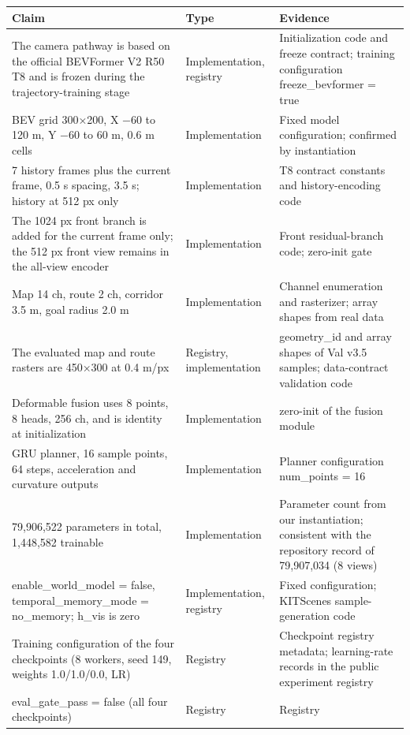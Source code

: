 \documentclass[
  english,
  10pt,
]{article}
\newcounter{none} %
\begin{document}
{\def\LTcaptype{none} %
\begingroup\scriptsize
\begin{longtable}[]{@{}lll@{}}
\toprule\noalign{}
Claim & Type & Evidence \\
\midrule\noalign{}
\endhead
\bottomrule\noalign{}
\endlastfoot
The camera pathway is based on the official BEVFormer V2 R50 T8 and is
frozen during the trajectory-training stage & Implementation, registry &
Initialization code and freeze contract; training configuration
freeze\_bevformer = true \\
BEV grid 300×200, X −60 to 120 m, Y −60 to 60 m, 0.6 m cells &
Implementation & Fixed model configuration; confirmed by
instantiation \\
7 history frames plus the current frame, 0.5 s spacing, 3.5 s; history
at 512 px only & Implementation & T8 contract constants and
history-encoding code \\
The 1024 px front branch is added for the current frame only; the 512 px
front view remains in the all-view encoder & Implementation & Front
residual-branch code; zero-init gate \\
Map 14 ch, route 2 ch, corridor 3.5 m, goal radius 2.0 m &
Implementation & Channel enumeration and rasterizer; array shapes from
real data \\
The evaluated map and route rasters are 450×300 at 0.4 m/px & Registry,
implementation & geometry\_id and array shapes of Val v3.5 samples;
data-contract validation code \\
Deformable fusion uses 8 points, 8 heads, 256 ch, and is identity at
initialization & Implementation & zero-init of the fusion module \\
GRU planner, 16 sample points, 64 steps, acceleration and curvature
outputs & Implementation & Planner configuration num\_points = 16 \\
79,906,522 parameters in total, 1,448,582 trainable & Implementation &
Parameter count from our instantiation; consistent with the repository
record of 79,907,034 (8 views) \\
enable\_world\_model = false, temporal\_memory\_mode = no\_memory;
h\_vis is zero & Implementation, registry & Fixed configuration;
KITScenes sample-generation code \\
Training configuration of the four checkpoints (8 workers, seed 149,
weights 1.0/1.0/0.0, LR) & Registry & Checkpoint registry metadata;
learning-rate records in the public experiment registry \\
eval\_gate\_pass = false (all four checkpoints) & Registry & Registry

\end{longtable}}
\end{document}
